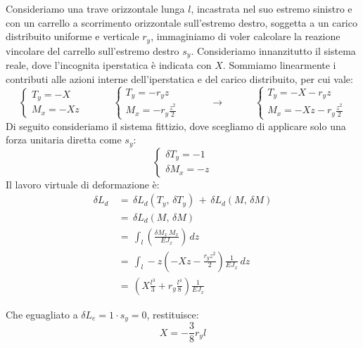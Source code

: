 \begin{esempioBox}
Consideriamo una trave orizzontale lunga $l$, incastrata nel suo estremo sinistro e con un carrello a scorrimento orizzontale sull'estremo destro, soggetta a un carico distribuito uniforme e verticale  $r_y$, immaginiamo di voler calcolare la reazione vincolare del carrello sull'estremo destro $s_y$.
Consideriamo innanzitutto il sistema reale, dove l'incognita iperstatica è indicata con $X$. Sommiamo linearmente i contributi alle azioni interne dell'iperstatica e del carico distribuito, per cui vale:
\begin{equation*}
    \begin{cases}
        T_y = -X \\
        M_x = -Xz
    \end{cases}
    \quad\quad\quad 
    \begin{cases}
        T_y = -r_y z\\
        M_x = -r_y \frac{z^2}{2}
    \end{cases}
    \quad\quad\quad \rightarrow\quad\quad\quad 
    \begin{cases}
        T_y = -X -r_y z\\
        M_x = -Xz -r_y \frac{z^2}{2}
    \end{cases}
\end{equation*}
Di seguito consideriamo il sistema fittizio, dove scegliamo di applicare solo una forza unitaria diretta come $s_y$:
\begin{equation*}
    \begin{cases}
        \delta T_y = -1\\
        \delta M_x = -z
    \end{cases}
\end{equation*}
Il lavoro virtuale di deformazione è:
\begin{align*}
    \delta L_d \,&=\, \delta L_d(T_y, \, \delta T_y)\,+\,\delta L_d(M, \, \delta M)\\
    &= \,\delta L_d(M, \, \delta M)\\
    &=\, \int_l 
    \left(
         \frac{\delta M_x \, M_x}{E J_x} 
    \right) \, dz \\
    &=\, \int_l  -z \left( -Xz- \frac{r_y z^2}{2}  \right) \frac{1}{E J_x}\, dz \\
    &=\, \left( X\frac{l^3}{3}+ r_y\frac{l^4}{8}  \right) \frac{1}{E J_x}
\end{align*}

Che eguagliato a $\delta L_e = 1\cdot s_{y}=0$, restituisce:
\begin{equation*}
    X = -\frac{3}{8}r_y l
\end{equation*}
\end{esempioBox}